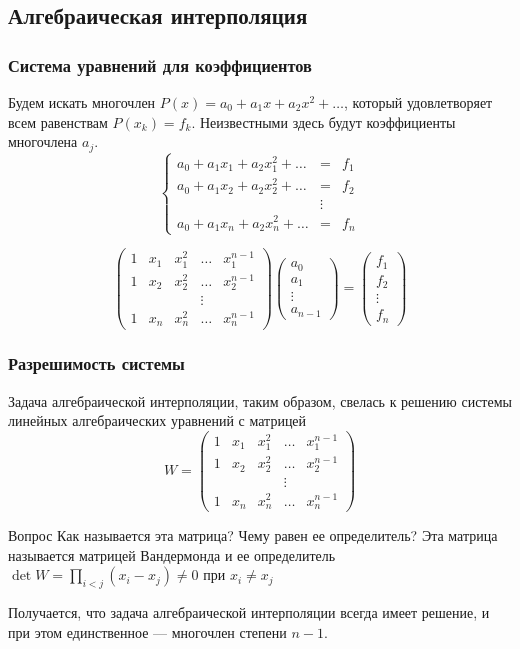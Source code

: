 \documentclass[aspectratio=169,unicode]{beamer}
\begin{document}
\subsection{Алгебраическая интерполяция}
\begin{frame}\frametitle{Система уравнений для коэффициентов}
	Будем искать многочлен $P(x) = a_0 + a_1 x + a_2 x^2 + \dots$, который удовлетворяет всем
	равенствам $P(x_k) = f_k$. Неизвестными здесь будут коэффициенты многочлена $a_j$.
	\pause
	\[
	\left\{
	\begin{array}{ccc}
	a_0 + a_1 x_1 + a_2 x_1^2 + \dots &=& f_1\\
	a_0 + a_1 x_2 + a_2 x_2^2 + \dots &=& f_2\\
	&\vdots&\\
	a_0 + a_1 x_n + a_2 x_n^2 + \dots &=& f_n
	\end{array}
	\right.
	\]

	\pause
	\[
	\begin{pmatrix}
		1&x_1&x_1^2& \dots & x_1^{n-1}\\
		1&x_2&x_2^2& \dots & x_2^{n-1}\\
		&&&\vdots\\
		1&x_n&x_n^2& \dots & x_n^{n-1}
	\end{pmatrix}
	\begin{pmatrix}
		a_0\\a_1\\\vdots\\a_{n-1}
	\end{pmatrix}
	 =
	\begin{pmatrix}
		f_1\\f_2\\\vdots\\f_n
	\end{pmatrix}
	\]
\end{frame}

\begin{frame}
\frametitle{Разрешимость системы}
	Задача алгебраической интерполяции, таким образом, свелась
	к решению системы линейных алгебраических уравнений с матрицей
	\[
	W = \begin{pmatrix}
		1&x_1&x_1^2& \dots & x_1^{n-1}\\
		1&x_2&x_2^2& \dots & x_2^{n-1}\\
		&&&\vdots\\
		1&x_n&x_n^2& \dots & x_n^{n-1}
	\end{pmatrix}
	\]
	\begin{block}{Вопрос}
		Как называется эта матрица? Чему равен ее определитель?
		\pause
		Эта матрица называется матрицей Вандермонда и ее определитель $\det W ={\prod}_{i<j}  (x_i-x_j) \neq 0$ при $x_i \neq x_j$
	\end{block}
	Получается, что задача алгебраической интерполяции всегда имеет решение, и при этом единственное --- многочлен степени $n-1$.
\end{frame}
\end{document}
